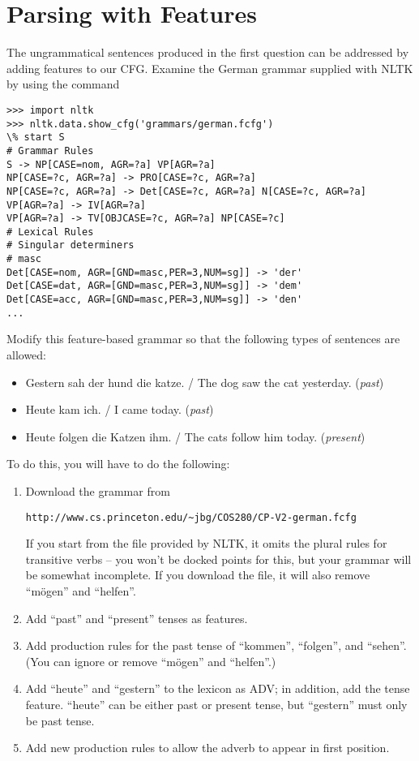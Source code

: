 \documentclass[11pt,twoside]{article}
\begin{document}
\section{Parsing with Features}

The ungrammatical sentences produced in the first question can be addressed by adding features to our CFG.   Examine the German grammar supplied with NLTK by using the command 
\begin{verbatim}
>>> import nltk
>>> nltk.data.show_cfg('grammars/german.fcfg')
\% start S
# Grammar Rules
S -> NP[CASE=nom, AGR=?a] VP[AGR=?a]
NP[CASE=?c, AGR=?a] -> PRO[CASE=?c, AGR=?a]
NP[CASE=?c, AGR=?a] -> Det[CASE=?c, AGR=?a] N[CASE=?c, AGR=?a]
VP[AGR=?a] -> IV[AGR=?a]
VP[AGR=?a] -> TV[OBJCASE=?c, AGR=?a] NP[CASE=?c]
# Lexical Rules
# Singular determiners
# masc
Det[CASE=nom, AGR=[GND=masc,PER=3,NUM=sg]] -> 'der' 
Det[CASE=dat, AGR=[GND=masc,PER=3,NUM=sg]] -> 'dem'
Det[CASE=acc, AGR=[GND=masc,PER=3,NUM=sg]] -> 'den'
...
\end{verbatim}

Modify this feature-based grammar so that the following types of sentences are allowed:
\begin{itemize}
\item Gestern sah der hund die katze. / The dog saw the cat yesterday. ({\em past})
\item Heute kam ich. / I came today. ({\em past})
\item Heute folgen die Katzen ihm. / The cats follow him today. ({\em present})
\end{itemize}

To do this, you will have to do the following:
\begin{enumerate}
\item Download the grammar from
\begin{verbatim}
http://www.cs.princeton.edu/~jbg/COS280/CP-V2-german.fcfg
\end{verbatim}
If you start from the file provided by NLTK, it omits the plural rules for transitive verbs -- you won't be docked points for this, but your grammar will be somewhat incomplete.  If you download the file, it will also remove ``m\"ogen'' and ``helfen''.
\item Add ``past'' and ``present'' tenses as features.
\item Add production rules for the past tense of ``kommen'', ``folgen'', and ``sehen''.  (You can ignore or remove ``m\"ogen'' and ``helfen''.)
\item Add ``heute'' and ``gestern'' to the lexicon as ADV; in addition, add the tense feature.  ``heute'' can be either past or present tense, but ``gestern'' must only be past tense.
\item Add new production rules to allow the adverb to appear in first position.
\end{enumerate}
\end{document}
